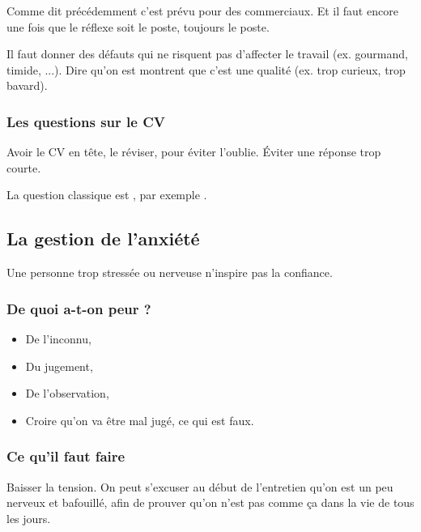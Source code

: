 Comme dit précédemment c'est prévu pour des commerciaux. Et il faut encore une fois que le réflexe soit le poste, toujours le poste.

Il faut donner des défauts qui ne risquent pas d'affecter le travail (ex. gourmand, timide, ...). Dire qu'on est  montrent que c'est une qualité (ex. trop curieux, trop bavard).

\subsubsection{Les questions sur le CV}
Avoir le CV en tête, le réviser, pour éviter l'oublie. Éviter une réponse trop courte.

La question classique est , par exemple .

\subsection{La gestion de l'anxiété}
Une personne trop stressée ou nerveuse n'inspire pas la confiance.

\subsubsection{De quoi a-t-on peur ?}
\begin{itemize}
    \item De l'inconnu,
    \item Du jugement,
    \item De l'observation,
    \item Croire qu'on va être mal jugé, ce qui est faux.
\end{itemize}

\subsubsection{Ce qu'il faut faire}
Baisser la tension. On peut s'excuser au début de l'entretien qu'on est un peu nerveux et bafouillé, afin de prouver qu'on n'est pas comme ça dans la vie de tous les jours.
